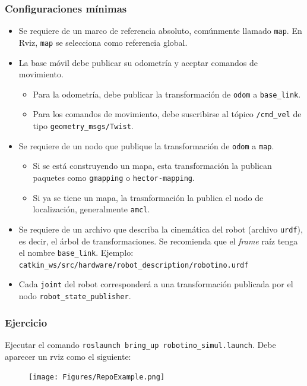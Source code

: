 \documentclass[10pt,spanish,aspectratio=1610]{beamer}
\begin{document}
\begin{frame}\frametitle{Configuraciones mínimas}
  \begin{itemize}
  \item Se requiere de un marco de referencia absoluto, comúnmente llamado \texttt{map}. En Rviz, \texttt{map} se selecciona como referencia global.
  \item La base móvil debe publicar su odometría y aceptar comandos de movimiento.
    \begin{itemize}
    \item Para la odometría, debe publicar la transformación de \texttt{odom} a \texttt{base\_link}.
    \item Para los comandos de movimiento, debe suscribirse al tópico \texttt{/cmd\_vel} de tipo \texttt{geometry\_msgs/Twist}.
    \end{itemize}
  \item Se requiere de un nodo que publique la transformación de \texttt{odom} a \texttt{map}.
    \begin{itemize}
    \item Si se está construyendo un mapa, esta transformación la publican paquetes como \texttt{gmapping} o \texttt{hector-mapping}.
    \item Si ya se tiene un mapa, la trasnformación la publica el nodo de localización, generalmente \texttt{amcl}. 
    \end{itemize}
  \item Se requiere de un archivo que describa la cinemática del robot (archivo \texttt{urdf}), es decir, el árbol de transformaciones. Se recomienda que el \textit{frame} raíz tenga el nombre \texttt{base\_link}. Ejemplo: \texttt{catkin\_ws/src/hardware/robot\_description/robotino.urdf}
    \item Cada \texttt{joint} del robot corresponderá a una transformación publicada por el nodo \texttt{robot\_state\_publisher}.
    \end{itemize}
\end{frame}

\begin{frame}\frametitle{Ejercicio}
  Ejecutar el comando \texttt{roslaunch bring\_up robotino\_simul.launch}. Debe aparecer un rviz como el siguiente:
  \begin{figure}
    \centering
    \texttt{[image: Figures/RepoExample.png]}
  \end{figure}
\end{frame}
\end{document}
